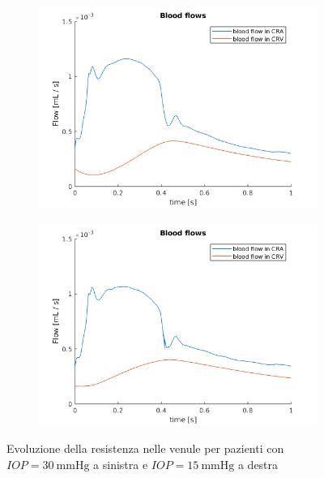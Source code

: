 \documentclass{article}
\begin{document}
\begin{figure}[ht]
\begin{subfigure}{.5\textwidth}
  \centering
  \includegraphics[width=1.0\linewidth]{Pictures/IOP30_part1/BF_30.png}
\end{subfigure}
\begin{subfigure}{.5\textwidth}
  \centering
  \includegraphics[width=1.0\linewidth]{Pictures/IOP15_part1/BF_15.png}
\end{subfigure}
\caption{Evoluzione della resistenza nelle venule per pazienti con $IOP = \SI{30}{\mmHg}$ a sinistra e $IOP = \SI{15}{\mmHg}$ a destra}
\label{flusso1530}
\end{figure}
\end{document}
